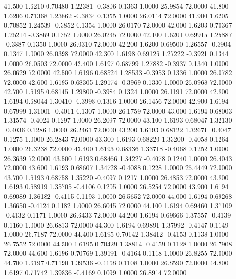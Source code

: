  41.500   1.6210   0.70480   1.22381  -0.3806   0.1363   1.0000  25.9854  72.0000
  41.800   1.6206   0.71368   1.23862  -0.3834   0.1355   1.0000  26.0114  72.0000
  41.900   1.6205   0.70852   1.24539  -0.3852   0.1354   1.0000  26.0170  72.0000
  42.000   1.6203   0.70367   1.25214  -0.3869   0.1352   1.0000  26.0235  72.0000
  42.100   1.6201   0.69915   1.25887  -0.3887   0.1350   1.0000  26.0310  72.0000
  42.200   1.6200   0.69500   1.26557  -0.3904   0.1347   1.0000  26.0398  72.0000
  42.300   1.6198   0.69126   1.27222  -0.3921   0.1344   1.0000  26.0503  72.0000
  42.400   1.6197   0.68799   1.27882  -0.3937   0.1340   1.0000  26.0629  72.0000
  42.500   1.6196   0.68524   1.28533  -0.3953   0.1336   1.0000  26.0782  72.0000
  42.600   1.6195   0.68305   1.29174  -0.3969   0.1330   1.0000  26.0968  72.0000
  42.700   1.6195   0.68145   1.29800  -0.3984   0.1324   1.0000  26.1191  72.0000
  42.800   1.6194   0.68044   1.30410  -0.3998   0.1316   1.0000  26.1456  72.0000
  42.900   1.6194   0.67999   1.31001  -0.4011   0.1307   1.0000  26.1759  72.0000
  43.000   1.6194   0.68003   1.31574  -0.4024   0.1297   1.0000  26.2097  72.0000
  43.100   1.6193   0.68047   1.32130  -0.4036   0.1286   1.0000  26.2461  72.0000
  43.200   1.6193   0.68122   1.32671  -0.4047   0.1275   1.0000  26.2843  72.0000
  43.300   1.6193   0.68220   1.33200  -0.4058   0.1264   1.0000  26.3238  72.0000
  43.400   1.6193   0.68336   1.33718  -0.4068   0.1252   1.0000  26.3639  72.0000
  43.500   1.6193   0.68466   1.34227  -0.4078   0.1240   1.0000  26.4043  72.0000
  43.600   1.6193   0.68607   1.34728  -0.4088   0.1228   1.0000  26.4449  72.0000
  43.700   1.6193   0.68758   1.35220  -0.4097   0.1217   1.0000  26.4853  72.0000
  43.800   1.6193   0.68919   1.35705  -0.4106   0.1205   1.0000  26.5254  72.0000
  43.900   1.6194   0.69089   1.36182  -0.4115   0.1193   1.0000  26.5652  72.0000
  44.000   1.6194   0.69268   1.36650  -0.4124   0.1182   1.0000  26.6045  72.0000
  44.100   1.6194   0.69460   1.37109  -0.4132   0.1171   1.0000  26.6433  72.0000
  44.200   1.6194   0.69666   1.37557  -0.4139   0.1160   1.0000  26.6813  72.0000
  44.300   1.6194   0.69891   1.37992  -0.4147   0.1149   1.0000  26.7187  72.0000
  44.400   1.6195   0.70142   1.38412  -0.4153   0.1138   1.0000  26.7552  72.0000
  44.500   1.6195   0.70429   1.38814  -0.4159   0.1128   1.0000  26.7908  72.0000
  44.600   1.6196   0.70769   1.39191  -0.4164   0.1118   1.0000  26.8255  72.0000
  44.700   1.6197   0.71190   1.39536  -0.4168   0.1108   1.0000  26.8590  72.0000
  44.800   1.6197   0.71742   1.39836  -0.4169   0.1099   1.0000  26.8914  72.0000
